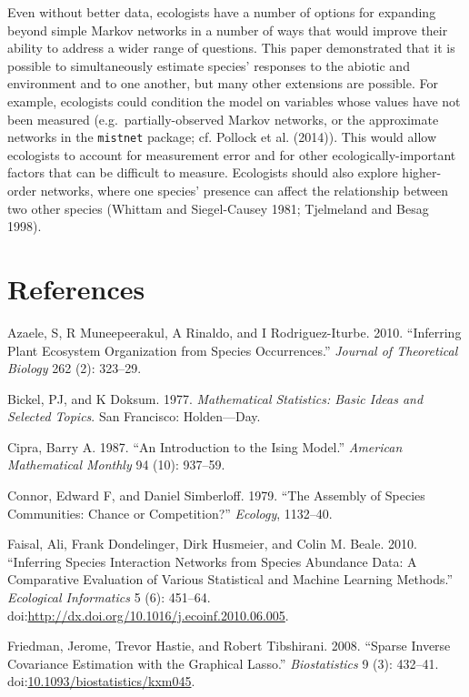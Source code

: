Even without better data, ecologists have a number of options for
expanding beyond simple Markov networks in a number of ways that would
improve their ability to address a wider range of questions. This paper
demonstrated that it is possible to simultaneously estimate species'
responses to the abiotic and environment and to one another, but many
other extensions are possible. For example, ecologists could condition
the model on variables whose values have not been measured
(e.g.~partially-observed Markov networks, or the approximate networks in
the \texttt{mistnet} package; cf. Pollock et al. (2014)). This would
allow ecologists to account for measurement error and for other
ecologically-important factors that can be difficult to measure.
Ecologists should also explore higher-order networks, where one species'
presence can affect the relationship between two other species (Whittam
and Siegel-Causey 1981; Tjelmeland and Besag 1998).

\section*{References}\label{references}

Azaele, S, R Muneepeerakul, A Rinaldo, and I Rodriguez-Iturbe. 2010.
``Inferring Plant Ecosystem Organization from Species Occurrences.''
\emph{Journal of Theoretical Biology} 262 (2): 323--29.

Bickel, PJ, and K Doksum. 1977. \emph{Mathematical Statistics: Basic
Ideas and Selected Topics}. San Francisco: Holden---Day.

Cipra, Barry A. 1987. ``An Introduction to the Ising Model.''
\emph{American Mathematical Monthly} 94 (10): 937--59.

Connor, Edward F, and Daniel Simberloff. 1979. ``The Assembly of Species
Communities: Chance or Competition?'' \emph{Ecology}, 1132--40.

Faisal, Ali, Frank Dondelinger, Dirk Husmeier, and Colin M. Beale. 2010.
``Inferring Species Interaction Networks from Species Abundance Data: A
Comparative Evaluation of Various Statistical and Machine Learning
Methods.'' \emph{Ecological Informatics} 5 (6): 451--64.
doi:\href{http://dx.doi.org/http://dx.doi.org/10.1016/j.ecoinf.2010.06.005}{http://dx.doi.org/10.1016/j.ecoinf.2010.06.005}.

Friedman, Jerome, Trevor Hastie, and Robert Tibshirani. 2008. ``Sparse
Inverse Covariance Estimation with the Graphical Lasso.''
\emph{Biostatistics} 9 (3): 432--41.
doi:\href{http://dx.doi.org/10.1093/biostatistics/kxm045}{10.1093/biostatistics/kxm045}.

